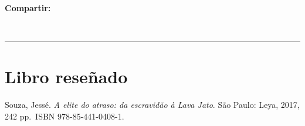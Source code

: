 \begin{textblock*}{68mm}
{\begin{minipage}[t]{68mm}
{\bfseries\color{azulrevista!70}Compartir:}\par\vspace{3pt}
{\large
\href{https://bsky.app/intent/compose?text=https%3A%2F%2Farchiveofourown.org%2Fworks%2F57620047%2Fchapters%2F146620033}{}~
\href{mailto:?subject=Rese%C3%B1a%20sobre%20un%20libro&body=https%3A%2F%2Farchiveofourown.org%2Fworks%2F57620047%2Fchapters%2F146620033}{}~
\href{https://www.facebook.com/sharer/sharer.php?u=https%3A%2F%2Farchiveofourown.org%2Fworks%2F57620047%2Fchapters%2F146620033}{}~
\href{https://www.linkedin.com/sharing/share-offsite/?url=https%3A%2F%2Farchiveofourown.org%2Fworks%2F57620047%2Fchapters%2F146620033}{}~
\href{https://www.reddit.com/submit?url=https%3A%2F%2Farchiveofourown.org%2Fworks%2F57620047%2Fchapters%2F146620033&title=Rese%C3%B1a%20sobre%20un%20libro}{}~
\href{https://www.researchgate.net/search?q=Rese%C3%B1a%20sobre%20un%20libro}{}~
\href{https://t.me/share/url?url=https%3A%2F%2Farchiveofourown.org%2Fworks%2F57620047%2Fchapters%2F146620033&text=Rese%C3%B1a%20sobre%20un%20libro}{}~
\href{https://wa.me/?text=https%3A%2F%2Farchiveofourown.org%2Fworks%2F57620047%2Fchapters%2F146620033}{}~
\href{https://twitter.com/intent/tweet?url=https%3A%2F%2Farchiveofourown.org%2Fworks%2F57620047%2Fchapters%2F146620033&text=Rese%C3%B1a%20sobre%20un%20libro}{}
}\par
\end{minipage}%
}%
\end{textblock*}


\bigskip
\noindent\rule{\linewidth}{0.4pt}
\bigskip

\section{Libro reseñado}

\begin{tcolorbox}[colback=white,colframe=azulrevista,leftrule=3pt,rightrule=0pt,toprule=0pt,bottomrule=0pt,arc=0pt,left=8pt,right=4pt,top=3pt,bottom=3pt,before skip=4pt,after skip=4pt]
{\sffamily\small
Souza, Jessé. \textit{A elite do atraso: da escravidão à Lava Jato}. São Paulo: Leya, 2017, 242 pp. ISBN 978-85-441-0408-1.

}
\end{tcolorbox}



